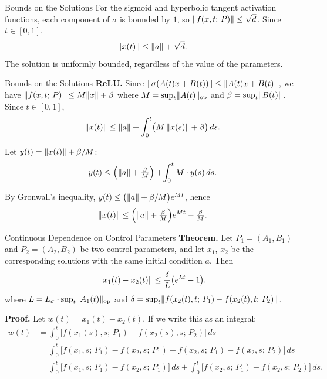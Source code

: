 \documentclass[aspectratio=169]{beamer}
\newcommand{\op}{\mathrm{op}}
\DeclarePairedDelimiter{\norm}{\lVert}{\rVert}
\begin{document}
\begin{frame}{Bounds on the Solutions}
For the sigmoid and hyperbolic tangent activation functions, each component of $\sigma$ is bounded by $1$, so $\norm{f(x, t;\,P)} \leq \sqrt{d}$. Since $t \in [0,1]$,
\[
\norm{x(t)} \leq \norm{a} + \sqrt{d}.
\]
The solution is uniformly bounded, regardless of the value of the parameters.
\end{frame}

\begin{frame}{Bounds on the Solutions}
\textbf{ReLU.} Since $\norm{\sigma(A(t)x + B(t))} \leq \norm{A(t)x + B(t)}$, we have $\norm{f(x, t;\,P)} \leq M\norm{x} + \beta$ where $M = \sup_t\norm{A(t)}_\op$ and $\beta = \sup_t\norm{B(t)}$. Since $t \in [0,1]$,
\[
\norm{x(t)} \leq \norm{a} + \int_0^t \bigl(M\,\norm{x(s)} + \beta\bigr)\,ds.
\]

Let $y(t) = \norm{x(t)} + \beta/M$:
\[
y(t) \leq \Bigl(\norm{a} + \tfrac{\beta}{M}\Bigr) + \!\int_0^t M \cdot y(s)\,ds.
\]

By Gronwall's inequality, $y(t) \leq \bigl(\norm{a} + \beta/M\bigr)e^{Mt}$, hence
\[
\norm{x(t)} \leq \Bigl(\norm{a} + \tfrac{\beta}{M}\Bigr)e^{Mt} - \tfrac{\beta}{M}.
\]
\end{frame}

\begin{frame}{Continuous Dependence on Control Parameters}
\textbf{Theorem.} Let $P_1 = (A_1, B_1)$ and $P_2 = (A_2, B_2)$ be two control parameters, and let $x_1$, $x_2$ be the corresponding solutions with the same initial condition $a$. Then
\[
\norm{x_1(t) - x_2(t)} \leq \frac{\delta}{L}\bigl(e^{Lt} - 1\bigr),
\]
where $L = L_\sigma \cdot \sup_t \norm{A_1(t)}_\op$ and $\delta = \sup_t \norm{f(x_2(t), t;\,P_1) - f(x_2(t), t;\,P_2)}$.

\bigskip
\textbf{Proof.} Let $w(t) = x_1(t) - x_2(t)$. If we write this as an integral:
\begin{align*}
w(t) &= \int_0^t \bigl[f(x_1(s), s;\,P_1) - f(x_2(s), s;\,P_2)\bigr]\,ds \\
     &= \int_0^t \bigl[f(x_1, s;\,P_1) - f(x_2, s;\,P_1) + f(x_2, s;\,P_1) - f(x_2, s;\,P_2)\bigr]\,ds \\
     &= \int_0^t \bigl[f(x_1, s;\,P_1) - f(x_2, s;\,P_1)\bigr]\,ds + \int_0^t \bigl[f(x_2, s;\,P_1) - f(x_2, s;\,P_2)\bigr]\,ds.
\end{align*}
\end{frame}
\end{document}
